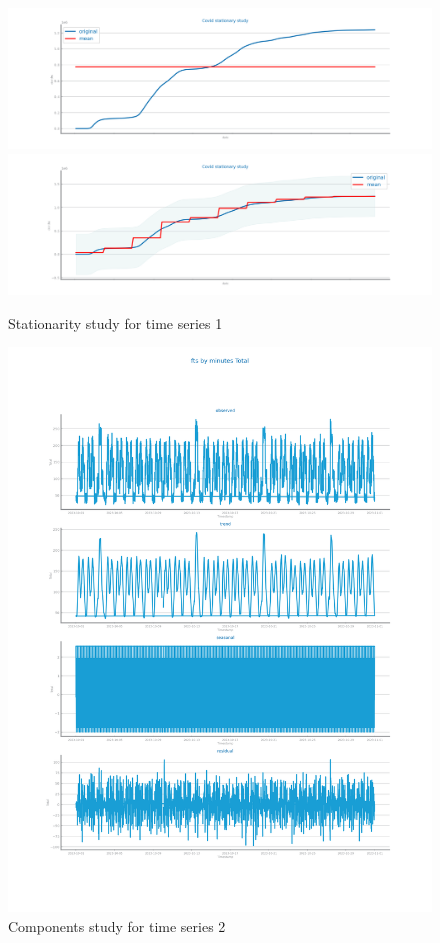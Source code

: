 \documentclass[10pt]{extarticle}
\begin{document}
\begin{figure}[H]
\centering\includegraphics[scale=0.6]{images/dataset1/time_series/Covid_stationarity_study_1.png}
\includegraphics[scale=0.6]{images/dataset1/time_series/Covid_stationarity_study_2.png}
\caption{Stationarity study for time series 1}
\end{figure}

\begin{figure}[H]
\centering\includegraphics[scale=0.50]{images/dataset2/time_series/fts_components_study.png}
\caption{Components study for time series 2}
\end{figure}
\end{document}
